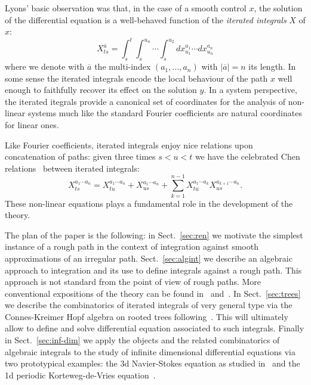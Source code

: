 \documentclass[a4paper]{article}
\newcommand{\1}{{\bf 1}}
\begin{document}
Lyons' basic observation was that, in the case of a smooth control $x$, the solution of the
differential equation is a well-behaved function of the \emph{iterated
integrals} $X$ of $x$:
\begin{equation}
  \label{eq:integrals}
X^{\overline a}_{ts} = \int_s^t \int_s^{u_n} \cdots
\int_s^{u_2} dx^{a_1}_{u_1} \cdots dx^{a_n}_{u_n}  
\end{equation}
where we denote with $\overline a$ the multi-index
$(a_1,\dots,a_n)$ with $|\overline a|=n$ its
length. In some sense the iterated integrals encode the local
behaviour of the path $x$ well enough to faithfully recover its effect
on the solution $y$. In a system perspective, the iterated itegrals
provide a canonical set of coordinates for the analysis of non-linear
systems much like the standard Fourier coefficients are natural
coordinates for linear ones.

Like Fourier coefficients, iterated integrals enjoy nice relations
upon concatenation of paths: given three times $s<u<t$ we have the
celebrated Chen relations~\cite{MR0454968} between iterated integrals:
\begin{equation}
  \label{eq:chen}
X^{a_1 \cdots a_n}_{ts} = X^{a_1 \cdots
  a_n}_{tu}+X^{a_1 \cdots a_n}_{us}+\sum_{k=1}^{n-1}X^{a_1
  \cdots a_k}_{tu} X^{a_{k+1} \cdots a_n}_{us}  .
\end{equation}
These non-linear equations plays a fundamental role in the development of the theory.

\bigskip
The plan of the paper is the following: in Sect.~\ref{sec:ren} we motivate the simplest instance of a rough path in the context of integration against smooth approximations of an irregular path. Sect.~\ref{sec:algint} we describe an algebraic approach to integration and its use to define integrals against a rough path. This approach is not standard from the point of view of rough paths. More conventional expositions of the theory can be found in~\cite{MR1654527,MR2036784} and~\cite{MR2053040}.  In Sect.~\ref{sec:trees} we describe the combinatorics of iterated integrals of very general type via the Connes-Kreimer Hopf algebra on rooted trees following~\cite{ramif}. This will ultimately allow to define and solve differential equation associated to such integrals. Finally in Sect.~\ref{sec:inf-dim} we apply the objects and the related combinatorics of algebraic integrals to the study of infinite dimensional differential equations via two prototypical examples: the 3d Navier-Stokes equation as studied in~\cite{MR2227041} and the 1d periodic Korteweg-de-Vries equation~\cite{kdv}.
\end{document}

